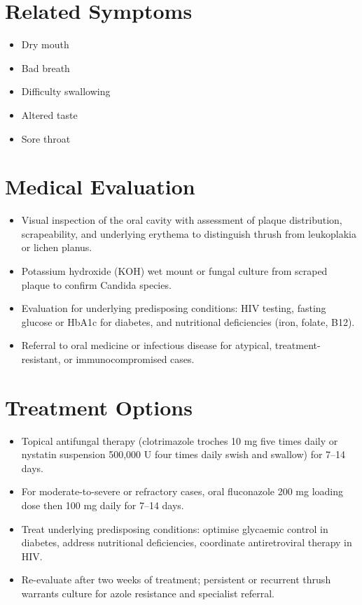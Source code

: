 \section*{Related Symptoms}
\begin{itemize}
  \item Dry mouth
  \item Bad breath
  \item Difficulty swallowing
  \item Altered taste
  \item Sore throat
\end{itemize}

\section*{Medical Evaluation}
\begin{itemize}
  \item Visual inspection of the oral cavity with assessment of plaque distribution, scrapeability, and underlying erythema to distinguish thrush from leukoplakia or lichen planus.
  \item Potassium hydroxide (KOH) wet mount or fungal culture from scraped plaque to confirm Candida species.
  \item Evaluation for underlying predisposing conditions: HIV testing, fasting glucose or HbA1c for diabetes, and nutritional deficiencies (iron, folate, B12).
  \item Referral to oral medicine or infectious disease for atypical, treatment-resistant, or immunocompromised cases.
\end{itemize}

\section*{Treatment Options}
\begin{itemize}
  \item Topical antifungal therapy (clotrimazole troches 10 mg five times daily or nystatin suspension 500,000 U four times daily swish and swallow) for 7--14 days.
  \item For moderate-to-severe or refractory cases, oral fluconazole 200 mg loading dose then 100 mg daily for 7--14 days.
  \item Treat underlying predisposing conditions: optimise glycaemic control in diabetes, address nutritional deficiencies, coordinate antiretroviral therapy in HIV.
  \item Re-evaluate after two weeks of treatment; persistent or recurrent thrush warrants culture for azole resistance and specialist referral.
\end{itemize}

